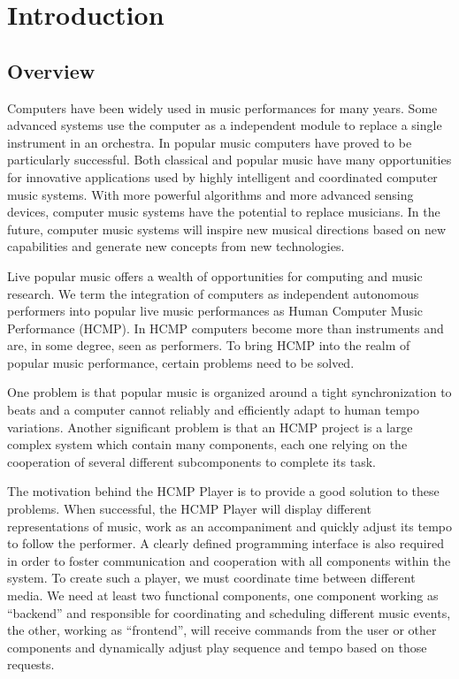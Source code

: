 \chapter{Introduction}

\ifpdf
    \graphicspath{{1_introduction/figures/PNG/}{1_introduction/figures/PDF/}{1_introduction/figures/}}
\else
    \graphicspath{{1_introduction/figures/EPS/}{1_introduction/figures/}}
\fi

\section{Overview}
Computers have been widely used in music performances for many years. Some
advanced systems use the computer as a independent module to replace a
single instrument in an orchestra. In popular music computers have proved
to be particularly successful. Both classical and popular music have many
opportunities for innovative applications used by highly intelligent and
coordinated computer music systems. With more powerful algorithms and more
advanced sensing devices, computer music systems have the potential to
replace musicians. In the future, computer music systems will inspire new 
musical directions based on new
capabilities and generate new concepts from new technologies.

Live popular music offers a wealth of opportunities for computing and music
research.  We term the integration of computers as independent autonomous
performers into popular live music performances as Human Computer Music
Performance (HCMP). In HCMP computers become more than instruments and are,
in some degree, seen as performers. To bring HCMP into the realm of popular
music performance, certain problems need to be solved. 

One problem is that
popular music is organized around a tight synchronization to beats and a
computer cannot reliably and efficiently adapt to human tempo variations.
Another significant problem is that an HCMP project is a large complex
system which contain many components, each one relying on the cooperation of several
different subcomponents to complete its task.

The motivation behind the HCMP Player is to provide a good solution to these
problems. When successful, the HCMP Player will display different
representations of music, work as an accompaniment  and quickly adjust its
tempo to follow the performer. A clearly defined programming interface is
also required in order to foster communication and cooperation with all
components within the system. To create such a player, we must coordinate
time between different media. We need at least two functional components,
one component working as ``backend'' and responsible for coordinating and
scheduling different music events, the other, working as ``frontend'', will
receive commands from the user or other components and dynamically adjust
play sequence and tempo based on those requests.

